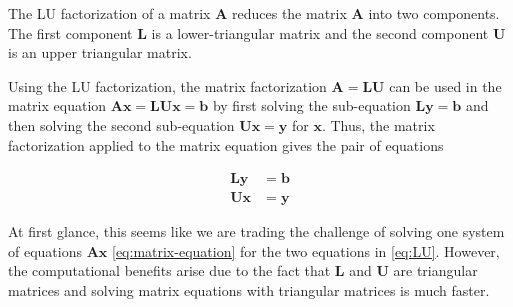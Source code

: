 \documentclass[
]{book}
\theoremstyle{definition}
\theoremstyle{definition}
\theoremstyle{definition}
\theoremstyle{definition}
\theoremstyle{remark}
\begin{document}
The LU factorization of a matrix \(\mathbf{A}\) reduces the matrix \(\mathbf{A}\) into two components. The first component \(\mathbf{L}\) is a lower-triangular matrix and the second component \(\mathbf{U}\) is an upper triangular matrix.

Using the LU factorization, the matrix factorization \(\mathbf{A} = \mathbf{L} \mathbf{U}\) can be used in the matrix equation \(\mathbf{A} \mathbf{x} = \mathbf{L} \mathbf{U}\mathbf{x} = \mathbf{b}\) by first solving the sub-equation \(\mathbf{L} \mathbf{y} = \mathbf{b}\) and then solving the second sub-equation \(\mathbf{U} \mathbf{x} = \mathbf{y}\) for \(\mathbf{x}\). Thus, the matrix factorization applied to the matrix equation gives the pair of equations

\[
\begin{aligned}
\mathbf{L} \mathbf{y} & = \mathbf{b} \\
\mathbf{U} \mathbf{x} & = \mathbf{y}
\end{aligned}
\label{eq:LU}
\]

At first glance, this seems like we are trading the challenge of solving one system of equations \(\mathbf{A}\mathbf{x}\) \eqref{eq:matrix-equation} for the two equations in \eqref{eq:LU}. However, the computational benefits arise due to the fact that \(\mathbf{L}\) and \(\mathbf{U}\) are triangular matrices and solving matrix equations with triangular matrices is much faster.
\end{document}
